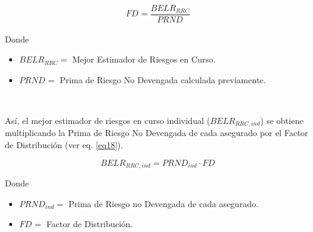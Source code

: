 \documentclass[11pt,twoside,openright,spanish]{report}
\numberwithin{equation}{chapter}
\numberwithin{figure}{chapter}
\numberwithin{table}{chapter}
\begin{document}
	 
	 \begin{equation}
	 	{FD}_{}^{}=\frac{{BELR}_{RRC}^{}}{{PRND}_{}}
	 	\label{eq17}
	 \end{equation}
	 
	 
	 Donde
	 
	 
	 \begin{itemize}
	 	\setlength\itemsep{-0.5em}
	 	\item $BELR_{RRC}=$ Mejor Estimador de Riesgos en Curso.
	 	
	 	\item $PRND_{}=$ Prima de Riesgo No Devengada calculada previamente.
	 	
	 \end{itemize}
	 
	 $ $
	 
	 
	 Así, el mejor estimador de riesgos en curso individual ($BELR_{RRC,ind}$) se obtiene multiplicando la Prima de Riesgo No Devengada de cada asegurado por el Factor de Distribución (ver eq. \ref{eq18}).
	 
	 
	 

	 
	 \begin{equation}
	 	BELR_{RRC,ind}=PRND_{ind}\cdot FD_{}
	 	\label{eq18}
	 \end{equation}
	 
	 
	 
	 Donde
	 
	 
	 \begin{itemize}
	 	\setlength\itemsep{-0.5em}	
	 	\item $PRND_{ind}=$ Prima de Riesgo no Devengada de cada asegurado.
	 	
	 	\item $FD_{}^{}=$ Factor de Distribución.
	 \end{itemize}
	 

	 
\end{document}
